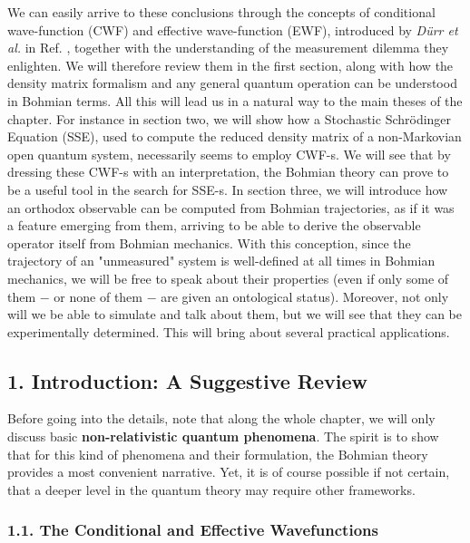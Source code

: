 \documentclass[11pt, a4paper]{article} %
\begin{document}
We can easily arrive to these conclusions through the concepts of conditional wave-function (CWF) and effective wave-function (EWF), introduced by {\em Dürr et al.} in Ref. \cite{Absolute}, together with the understanding of the measurement dilemma they enlighten. We will therefore review them in the first section, along with how the density matrix formalism and any general quantum operation can be understood in Bohmian terms. All this will lead us in a natural way to the main theses of the chapter. For instance in section two, we will show how a Stochastic Schrödinger Equation (SSE), used to compute the reduced density matrix of a non-Markovian open quantum system, necessarily seems to employ CWF-s. We will see that by dressing these CWF-s with an interpretation, the Bohmian theory can prove to be a useful tool in the search for SSE-s. In section three, we will introduce how an orthodox observable can be computed from Bohmian trajectories, as if it was a feature emerging from them, arriving to be able to derive the observable operator itself from Bohmian mechanics. With this conception, since the trajectory of an "unmeasured" system is well-defined at all times in Bohmian mechanics, we will be free to speak about their properties (even if only some of them $-$ or none of them $-$ are given an ontological status). Moreover, not only will we be able to simulate and talk about them, but we will see that they can be experimentally determined. This will bring about several practical applications.


\subsection*{1. Introduction: A Suggestive Review}
\vspace{-0.2cm}

Before going into the details, note that along the whole chapter, we will only discuss basic {\bf non-relativistic quantum phenomena}. The spirit is to show that for this kind of phenomena and their formulation, the Bohmian theory provides a most convenient narrative. Yet, it is of course possible if not certain, that a deeper level in the quantum theory may require other frameworks.\vspace{-0.3cm}

\subsubsection*{1.1. The Conditional and Effective Wavefunctions}
\vspace{-0.2cm}
\end{document}
